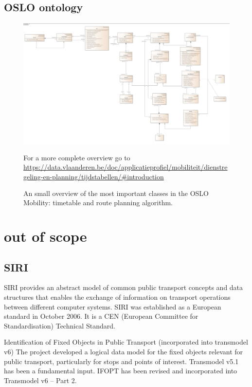 \begin{appendices}

\newpage

\begin{landscape}
\section{OSLO ontology}
    \begin{figure}[H]
    \centering
    \includegraphics[width=1.4\textwidth]{images/overview.jpg}
    \caption{An small overview of the most important classes in the OSLO Mobility: timetable and route planning algorithm. }
    \tiny For a more complete overview go to \url{https://data.vlaanderen.be/doc/applicatieprofiel/mobiliteit/dienstregeling-en-planning/tijdstabellen/#introduction}
    \label{fig:appendix:Ontology:oslo:overview}
\end{figure}
\end{landscape}

\section{out of scope}
\subsection*{SIRI}
SIRI provides an abstract model of common public transport concepts and data structures that enables the exchange of information on transport operations between different computer systems. SIRI was established as a European standard in October 2006. It is a CEN (European Committee for Standardisation) Technical Standard.

 Identification of Fixed Objects in Public Transport (incorporated into transmodel v6)
The project developed a logical data model for the fixed objects relevant for public transport, particularly for stops and points of interest. Transmodel v5.1 has been a fundamental input. IFOPT has been revised and incorporated into Transmodel v6 – Part 2.

\end{appendices}